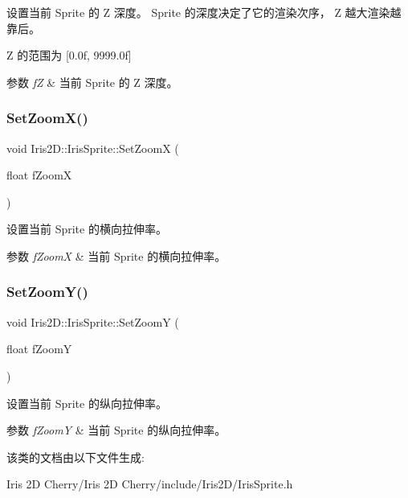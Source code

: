 设置当前 Sprite 的 Z 深度。 Sprite 的深度决定了它的渲染次序， Z 越大渲染越靠后。 

Z 的范围为 \mbox{[}0.\+0f, 9999.\+0f\mbox{]} 
\begin{DoxyParams}{参数}
{\em fZ} & 当前 Sprite 的 Z 深度。 \\
\hline
\end{DoxyParams}
\mbox{\label{class_iris2_d_1_1_iris_sprite_a0c7c13b0d3ec355a09e3c9c2ccc9d91e}} 
\subsubsection{\texorpdfstring{Set\+Zoom\+X()}{SetZoomX()}}
{\footnotesize\ttfamily void Iris2\+D\+::\+Iris\+Sprite\+::\+Set\+ZoomX (\begin{DoxyParamCaption}\item[{float}]{f\+ZoomX }\end{DoxyParamCaption})}



设置当前 Sprite 的横向拉伸率。 


\begin{DoxyParams}{参数}
{\em f\+ZoomX} & 当前 Sprite 的横向拉伸率。 \\
\hline
\end{DoxyParams}
\mbox{\label{class_iris2_d_1_1_iris_sprite_a316b2fbf2d0ecb1a1cd5b7bb95d62f05}} 
\subsubsection{\texorpdfstring{Set\+Zoom\+Y()}{SetZoomY()}}
{\footnotesize\ttfamily void Iris2\+D\+::\+Iris\+Sprite\+::\+Set\+ZoomY (\begin{DoxyParamCaption}\item[{float}]{f\+ZoomY }\end{DoxyParamCaption})}



设置当前 Sprite 的纵向拉伸率。 


\begin{DoxyParams}{参数}
{\em f\+ZoomY} & 当前 Sprite 的纵向拉伸率。 \\
\hline
\end{DoxyParams}


该类的文档由以下文件生成\+:\begin{DoxyCompactItemize}
\item 
Iris 2\+D Cherry/\+Iris 2\+D Cherry/include/\+Iris2\+D/Iris\+Sprite.\+h\end{DoxyCompactItemize}
